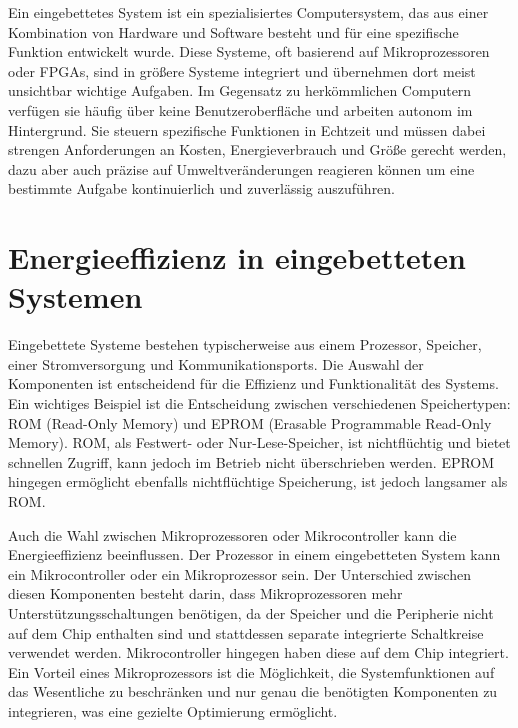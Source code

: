 \documentclass[footmark=none]{tubaf-thesis}
\begin{document}
    		Ein eingebettetes System ist ein spezialisiertes Computersystem, das aus einer Kombination von Hardware und Software besteht und für eine spezifische Funktion entwickelt wurde. Diese Systeme, oft basierend auf Mikroprozessoren oder FPGAs, sind in größere Systeme integriert und übernehmen dort meist unsichtbar wichtige Aufgaben. Im Gegensatz zu herkömmlichen Computern verfügen sie häufig über keine Benutzeroberfläche und arbeiten autonom im Hintergrund. Sie steuern spezifische Funktionen in Echtzeit und müssen dabei strengen Anforderungen an Kosten, Energieverbrauch und Größe gerecht werden, dazu aber auch präzise auf Umweltveränderungen reagieren können um eine bestimmte Aufgabe kontinuierlich und zuverlässig auszuführen. \cite{gessler2014entwicklung}
    	\section{Energieeffizienz in eingebetteten Systemen}
    		Eingebettete Systeme bestehen typischerweise aus einem Prozessor, Speicher, einer Stromversorgung und Kommunikationsports. Die Auswahl der Komponenten ist entscheidend für die Effizienz und Funktionalität des Systems. Ein wichtiges Beispiel ist die Entscheidung zwischen verschiedenen Speichertypen: ROM (Read-Only Memory) und EPROM (Erasable Programmable Read-Only Memory). ROM, als Festwert- oder Nur-Lese-Speicher, ist nichtflüchtig und bietet schnellen Zugriff, kann jedoch im Betrieb nicht überschrieben werden. EPROM hingegen ermöglicht ebenfalls nichtflüchtige Speicherung, ist jedoch langsamer als ROM. \cite{klar2015integrierte}
    		
    		Auch die Wahl zwischen Mikroprozessoren oder Mikrocontroller kann die Energieeffizienz beeinflussen. Der Prozessor in einem eingebetteten System kann ein Mikrocontroller oder ein Mikroprozessor sein. Der Unterschied zwischen diesen Komponenten besteht darin, dass Mikroprozessoren mehr Unterstützungsschaltungen benötigen, da der Speicher und die Peripherie nicht auf dem Chip enthalten sind und stattdessen separate integrierte Schaltkreise verwendet werden. Mikrocontroller hingegen haben diese auf dem Chip integriert.  Ein Vorteil eines Mikroprozessors ist die Möglichkeit, die Systemfunktionen auf das Wesentliche zu beschränken und nur genau die benötigten Komponenten zu integrieren, was eine gezielte Optimierung ermöglicht. \cite{Urbanski2004}
\end{document}
